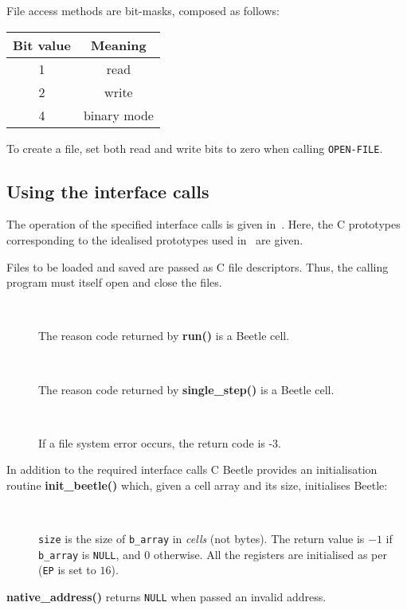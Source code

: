 \documentclass[english]{article}
\newlength{\ifacewidth}\ifacewidth=\textwidth \advance\ifacewidth by -0.1in
\newlength{\innerwidth}\innerwidth=\ifacewidth \advance\innerwidth by -0.5in
\newcommand{\ifacec}[2]{\item[]\parbox{\ifacewidth}{\hspace*{2.5mm}{\tt #1}\\[0.5ex]\hspace*{0.4in}\parbox{\innerwidth}{#2}}}
\begin{document}
File access methods are bit-masks, composed as follows:

\begin{center}
\begin{tabular}{cc} \toprule
\rule[-2mm]{0mm}{6mm}\bf Bit value & \bf Meaning \\ \midrule
1 & read \\
2 & write \\
4 & binary mode \\ \bottomrule
\end{tabular}
\end{center}

To create a file, set both read and write bits to zero when calling {\tt OPEN-FILE}.


\subsection{Using the interface calls}
\label{usingcalls}

The operation of the specified interface calls is given in~\cite{beetle}. Here, the C prototypes corresponding to the idealised prototypes used in~\cite{beetle} are given.

Files to be loaded and saved are passed as C file descriptors. Thus, the
calling program must itself open and close the files.

\begin{description}
\ifacec{CELL run()}{The reason code returned by {\bf run()} is a Beetle
cell.}
\ifacec{CELL single\_step()}{The reason code returned by {\bf single\_step()}
is a Beetle cell.}
\ifacec{int load\_object(FILE *file, UCELL address)}{If a file system error
occurs, the return code is -3.}
\end{description}

In addition to the required interface calls C Beetle provides an initialisation routine {\bf init\_beetle()} which, given a cell array and its size, initialises Beetle:

\begin{description}
\ifacec{int init\_beetle(CELL *b\_array, long size)}{{\tt size} is
the size of {\tt b\_array} in {\em cells} (not bytes). The return value is $-1$ if {\tt b\_array} is {\tt NULL}, and $0$ otherwise.
All the registers are initialised as per~\cite{beetle} ({\tt EP} is set to $16$).}
\end{description}

{\bf native\_address()} returns {\tt NULL} when passed an invalid address.
\end{document}
